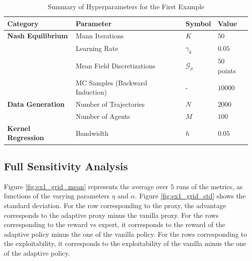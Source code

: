 \documentclass{article}
\theoremstyle{plain}
\begin{document}
\begin{table}[htbp]
\centering
\caption{Summary of Hyperparameters for the First Example}
\label{tab:ex1_hyperparameters}
\begin{tabular}{@{}llll@{}}
\toprule
\textbf{Category} & \textbf{Parameter} & \textbf{Symbol} & \textbf{Value} \\ \midrule
\textbf{Nash Equilibrium} & Mann Iterations & $K$ & $50$ \\
& Learning Rate & $\gamma_k$ & $0.05$ \\
& Mean Field Discretizations & $\mathcal{G}_{\rho}$ & $50$ points \\ \addlinespace
& MC Samples (Backward Induction) & - & $10000$ \\ \addlinespace
\textbf{Data Generation} & Number of Trajectories & $N$ & $2000$ \\
& Number of Agents & $M$ & $100$ \\ \addlinespace
\textbf{Kernel Regression} & Bandwidth & $h$ & $0.05$ \\ \bottomrule
\end{tabular}
\end{table}

\subsection{Full Sensitivity Analysis }

Figure \ref{fig:ex1_grid_mean} represents the average over $5$ runs of the metrics, as functions of the varying parameters $\eta$ and $\alpha$. Figure \ref{fig:ex1_grid_std} shows the standard deviation. For the row corresponding to the proxy, the advantage corresponds to the adaptive proxy minus the vanilla proxy. For the rows corresponding to the reward vs expert, it corresponds to the reward of the adaptive policy minus the one of the vanilla policy. For the rows corresponding to the exploitability, it corresponds to the exploitability of the vanilla minus the one of the adaptive policy.

\end{document}
